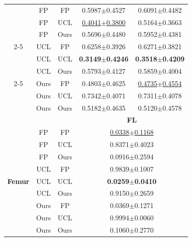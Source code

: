 \begin{table}[t]
\begin{tabular}{|c|c|c|c|c|}
 & FP & FP & 0.5987$\pm$0.4527 & 0.6091$\pm$0.4482\\
 & FP & UCL & \underline{0.4041$\pm$0.3800} & 0.5164$\pm$0.3663\\
 & FP & Ours & 0.5696$\pm$0.4480 & 0.5952$\pm$0.4381\\
 \cline{2-5}
 & UCL & FP & 0.6258$\pm$0.3926 & 0.6271$\pm$0.3821\\
 & UCL & UCL & \textbf{0.3149$\pm$0.4246} & \textbf{0.3518$\pm$0.4209}\\
 & UCL & Ours & 0.5793$\pm$0.4127 & 0.5859$\pm$0.4004\\
 \cline{2-5}
 & Ours & FP & 0.4803$\pm$0.4625 & \underline{0.4735$\pm$0.4554}\\
 & Ours & UCL & 0.7342$\pm$0.4071 & 0.7311$\pm$0.4078\\
 & Ours & Ours & 0.5182$\pm$0.4635 & 0.5120$\pm$0.4578\\
 \hline
\textbf{} & \textbf{} & \textbf{} & \multicolumn{2}{c|}{\textbf{FL}} \\ \hline
\multirow{9}{*}{\textbf{Femur}}
 & FP & FP & \multicolumn{2}{c|}{\underline{0.0338$\pm$0.1168}}\\
 & FP & UCL & \multicolumn{2}{c|}{0.8371$\pm$0.4023}\\
 & FP & Ours & \multicolumn{2}{c|}{0.0916$\pm$0.2594}\\
 \cline{2-5}
 & UCL & FP & \multicolumn{2}{c|}{0.9839$\pm$0.1007}\\
 & UCL & UCL & \multicolumn{2}{c|}{\textbf{0.0259$\pm$0.0410}}\\
 & UCL & Ours & \multicolumn{2}{c|}{0.9150$\pm$0.2659}\\
 \cline{2-5}
 & Ours & FP & \multicolumn{2}{c|}{0.0369$\pm$0.1271}\\
 & Ours & UCL & \multicolumn{2}{c|}{0.9994$\pm$0.0060}\\
 & Ours & Ours & \multicolumn{2}{c|}{0.1060$\pm$0.2770}\\
 \hline
\end{tabular}
\end{table}

